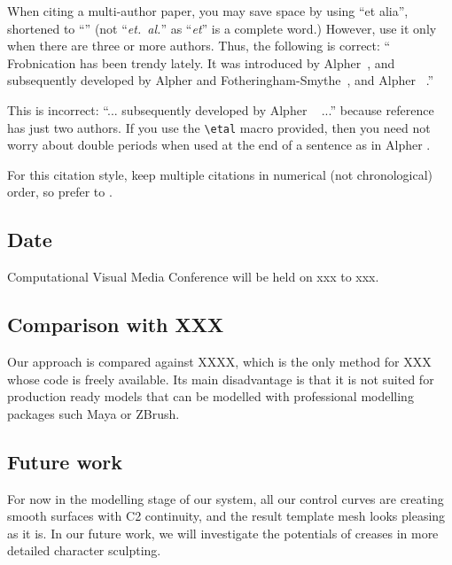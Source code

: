 \documentclass[10pt,twocolumn,letterpaper]{article}
\begin{document}
When citing a multi-author paper, you may save space by using ``et alia'',
shortened to ``\etal'' (not ``{\em et.\ al.}'' as ``{\em et}'' is a complete word.)
However, use it only when there are three or more authors.  Thus, the
following is correct: ``
   Frobnication has been trendy lately.
   It was introduced by Alpher~\cite{Alpher02}, and subsequently developed by
   Alpher and Fotheringham-Smythe~\cite{Alpher03}, and Alpher \etal~\cite{Alpher04}.''

This is incorrect: ``... subsequently developed by Alpher \etal~\cite{Alpher03} ...''
because reference~\cite{Alpher03} has just two authors.  If you use the
\verb'\etal' macro provided, then you need not worry about double periods
when used at the end of a sentence as in Alpher \etal.

For this citation style, keep multiple citations in numerical (not
chronological) order, so prefer \cite{Alpher03,Alpher02,Authors12} to
\cite{Alpher02,Alpher03,Authors12}.



\subsection{Date}
Computational Visual Media Conference will be held on xxx to xxx.
\subsection{Comparison with XXX}

Our approach is compared against XXXX, which is the only method for XXX whose code is freely available. 
Its main disadvantage is that it is not suited for production ready models that can be modelled with professional modelling packages such Maya or ZBrush.\\
\subsection{Future work}

For now in the modelling stage of our system, all our control curves are creating smooth surfaces with C2 continuity, and the result template mesh looks pleasing as it is. In our future work, we will investigate the potentials of creases in more detailed character sculpting.
\end{document}
